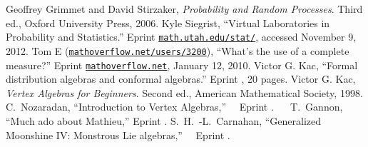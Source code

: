 \begin{thebibliography}{99}\small
{}
  Geoffrey Grimmet and David Stirzaker,\newblock
  \emph{Probability and Random Processes}.\newblock
  Third ed., Oxford University Press, 2006.
  Kyle Siegrist,\newblock
  ``Virtual Laboratories in Probability and Statistics.''\newblock
  Eprint \href{http://www.math.uah.edu/stat/index.html}{\tt math.utah.edu/stat/}, accessed November
9, 2012.
  Tom E (\href{http://mathoverflow.net/users/3200/tom-e}{\tt mathoverflow.net/users/3200}),\newblock 
  ``What's the use of a complete measure?''\newblock
  Eprint \href{http://mathoverflow.net/questions/11554}{\tt mathoverflow.net}, January 12, 2010.
  Victor G. Kac,\newblock
  ``Formal distribution algebras and conformal algebras.''\newblock
  Eprint , 20 pages.
  Victor G. Kac,\newblock
  \emph{Vertex Algebras for Beginners}.\newblock
  Second ed., American Mathematical Society, 1998.
  C.~Nozaradan,\newblock
  ``Introduction to Vertex Algebras,''\newblock
  Eprint .
  T.~Gannon,\newblock
  ``Much ado about Mathieu,''\newblock
  Eprint .
  S.~H.~-L.~Carnahan,\newblock
  ``Generalized Moonshine IV: Monstrous Lie algebras,''\newblock
  Eprint .
\end{thebibliography}
